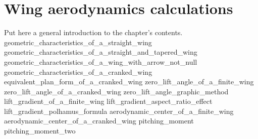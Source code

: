 \documentclass[[12pt,twoside]{book}
\begin{document}
%
%
\chapter%
   [Wing aerodynamics calculations]%
   {Wing aerodynamics calculations}
\label{chap:Wing}

\setcounter{minitocdepth}{2}%
\minitoc %

\vspace{\baselineskip}

\noindent
Put here a general introduction to the chapter's contents.
%
{geometric_characteristics_of_a_straight_wing}
{geometric_characteristics_of_a_straight_and_tapered_wing}
{geometric_characteristics_of_a_wing_with_arrow_not_null}
{geometric_characteristics_of_a_cranked_wing}
{equivalent_plan_form_of_a_cranked_wing}
{zero_lift_angle_of_a_finite_wing}
{zero_lift_angle_of_a_cranked_wing}
{zero_lift_angle_graphic_method}
{lift_gradient_of_a_finite_wing}
{lift_gradient_aspect_ratio_effect}
{lift_gradient_polhamus_formula}
{aerodynamic_center_of_a_finite_wing}
{aerodynamic_center_of_a_cranked_wing}
{pitching_moment}
{pitching_moment_two}
\end{document}
